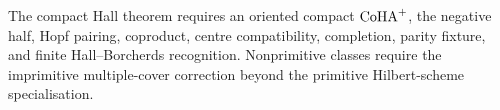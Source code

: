 The compact Hall theorem requires an oriented compact \(\mathrm{CoHA}^+\), the
negative half, Hopf pairing, coproduct, centre compatibility,
completion, parity fixture, and finite Hall--Borcherds recognition.
Nonprimitive classes require the imprimitive multiple-cover correction
beyond the primitive Hilbert-scheme specialisation.
